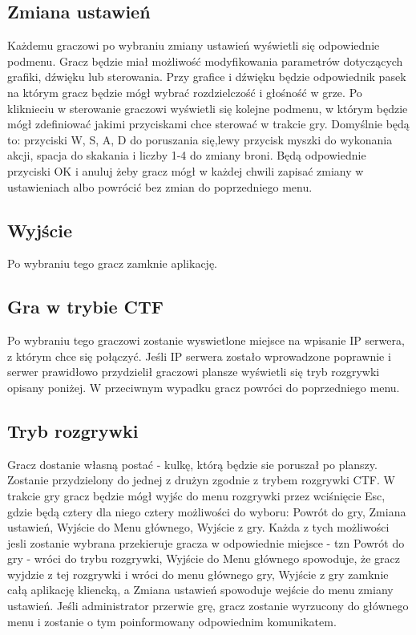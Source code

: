 \documentclass[12pt,a4paper,twoside]{article}
\begin{document}
\subsection{Zmiana ustawień}
Każdemu graczowi po wybraniu zmiany ustawień wyświetli się odpowiednie podmenu. Gracz będzie miał możliwość modyfikowania parametrów dotyczących grafiki, dźwięku lub sterowania. Przy grafice i dźwięku będzie odpowiednik pasek na którym gracz będzie mógł wybrać rozdzielczość i głośność w grze. Po kliknieciu w sterowanie graczowi wyświetli się kolejne podmenu, w którym będzie mógł zdefiniować jakimi przyciskami chce sterować w trakcie gry. Domyślnie będą to: przyciski W, S, A, D do poruszania się,lewy przycisk myszki do wykonania akcji, spacja do skakania i liczby 1-4 do zmiany broni. Będą odpowiednie przyciski OK i anuluj żeby gracz mógł w każdej chwili zapisać zmiany w ustawieniach albo powrócić bez zmian do poprzedniego menu.

\subsection{Wyjście}
Po wybraniu tego gracz zamknie aplikację.

\subsection{Gra w trybie CTF}
Po wybraniu tego graczowi zostanie wyswietlone miejsce na wpisanie IP serwera, z którym chce się połączyć. Jeśli IP serwera zostało wprowadzone poprawnie i serwer prawidłowo przydzielił graczowi plansze wyświetli się tryb rozgrywki opisany poniżej. W przeciwnym wypadku gracz powróci do poprzedniego menu.

\subsection{Tryb rozgrywki}
Gracz dostanie własną postać - kulkę, którą będzie sie poruszał po planszy. Zostanie przydzielony do jednej z drużyn zgodnie z trybem rozgrywki CTF. W trakcie gry gracz będzie mógł wyjśc do menu rozgrywki przez wciśnięcie Esc, gdzie będą cztery dla niego cztery możliwości do wyboru: Powrót do gry, Zmiana ustawień, Wyjście do Menu głównego, Wyjście z gry. Każda z tych możliwości jesli zostanie wybrana przekieruje gracza w odpowiednie miejsce - tzn Powrót do gry - wróci do trybu rozgrywki, Wyjście do Menu głównego spowoduje, że gracz wyjdzie z tej rozgrywki i wróci do menu głównego gry, Wyjście z gry zamknie całą aplikację kliencką, a Zmiana ustawień spowoduje wejście do menu zmiany ustawień. Jeśli administrator przerwie grę, gracz zostanie wyrzucony do głównego menu i zostanie o tym poinformowany odpowiednim komunikatem.
\end{document}
